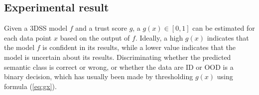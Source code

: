 \documentclass[journal]{IEEEtran}
\begin{document}

\subsection{Experimental result}

Given a 3DSS model $f$ and a trust score $g$, a $g(x) \in [0,1]$ can be estimated for each data point $x$ based on the output of $f$.
Ideally, a high $g(x)$ indicates that the model $f$ is confident in its results, while a lower value indicates that the model is uncertain about its results.
Discriminating whether the predicted semantic class is correct or wrong, or whether the data are ID or OOD is a binary decision, which has usually been made by thresholding $g(x)$ using formula (\ref{eq:gx}).
\end{document}
